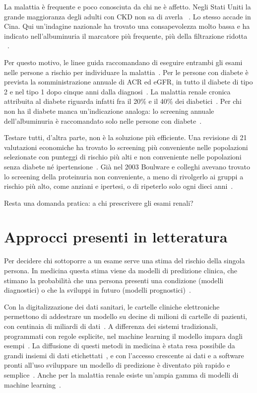 \documentclass[a4paper, 12pt, oneside]{book}
\begin{document}
La malattia è frequente e poco conosciuta da chi ne è affetto. Negli Stati Uniti la grande maggioranza degli adulti con CKD non sa di averla ~\cite{centers_for_disease_and_prevention_chronic_2026}. Lo stesso accade in Cina. Qui un'indagine nazionale ha trovato una consapevolezza molto bassa e ha indicato nell'albuminuria il marcatore più frequente, più della filtrazione ridotta ~\cite{wang_prevalence_2023}.

Per questo motivo, le linee guida raccomandano di eseguire entrambi gli esami nelle persone a rischio per individuare la malattia~\cite{stevens_kdigo_2024}. Per le persone con diabete è prevista la somministrazione annuale di ACR ed eGFR, in tutto il diabete di tipo 2 e nel tipo 1 dopo cinque anni dalla diagnosi~\cite{american_diabetes_association_professional_practice_committee_11_2024}. La malattia renale cronica attribuita al diabete riguarda infatti fra il 20\% e il 40\% dei diabetici~\cite{american_diabetes_association_professional_practice_committee_11_2024}. Per chi non ha il diabete manca un'indicazione analoga: lo screening annuale dell'albuminuria è raccomandato solo nelle persone con diabete~\cite{bragg-gresham_using_2025}.

Testare tutti, d'altra parte, non è la soluzione più efficiente. Una revisione di 21 valutazioni economiche ha trovato lo screening più conveniente nelle popolazioni selezionate con punteggi di rischio più alti e non conveniente nelle popolazioni senza diabete né ipertensione~\cite{yeo_cost-effectiveness_2024}. Già nel 2003 Boulware e colleghi avevano trovato lo screening della proteinuria non conveniente, a meno di rivolgerlo ai gruppi a rischio più alto, come anziani e ipertesi, o di ripeterlo solo ogni dieci anni~\cite{boulware_screening_2003}.

Resta una domanda pratica: a chi prescrivere gli esami renali?

\section{Approcci presenti in letteratura}
Per decidere chi sottoporre a un esame serve una stima del rischio della singola persona. In medicina questa stima viene da modelli di predizione clinica, che stimano la probabilità che una persona presenti una condizione (modelli diagnostici) o che la sviluppi in futuro (modelli prognostici)~\cite{collins_tripodai_2024}.

Con la digitalizzazione dei dati sanitari, le cartelle cliniche elettroniche permettono di addestrare un modello su decine di milioni di cartelle di pazienti, con centinaia di miliardi di dati~\cite{rajkomar_machine_2019}. A differenza dei sistemi tradizionali, programmati con regole esplicite, nel machine learning il modello impara dagli esempi~\cite{rajkomar_machine_2019}. La diffusione di questi metodi in medicina è stata resa possibile da grandi insiemi di dati etichettati~\cite{topol_high-performance_2019}, e con l'accesso crescente ai dati e a software pronti all'uso sviluppare un modello di predizione è diventato più rapido e semplice~\cite{collins_tripodai_2024}. Anche per la malattia renale esiste un'ampia gamma di modelli di machine learning~\cite{sanmarchi_predict_2023}.
\end{document}
